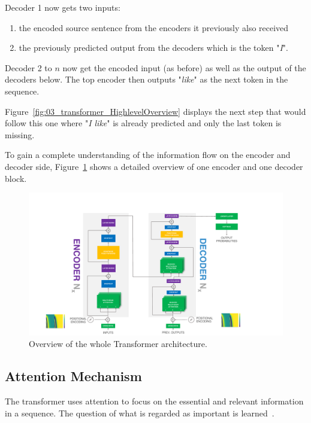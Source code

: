 Decoder 1 now gets two inputs: 

\begin{enumerate}
    \item the encoded source sentence from the encoders it previously also received
    \item the previously predicted output from the decoders which is the token "\textit{I}".
\end{enumerate}

Decoder 2 to $n$ now get the encoded input {(as before)} as well as the output of the decoders below. The top encoder then outputs "\textit{like}" as the next token in the sequence. 

Figure~\ref{fig:03_transformer_HighlevelOverview} displays the next step that would follow this one where "\textit{I like}" is already predicted and only the last token is missing.
\bigskip

To gain a complete understanding of the information flow on the encoder and decoder side, Figure~\ref{fig:03_transformer_overview} shows a detailed overview of one encoder and one decoder block.

\begin{figure}[t]
    \centering
    \includegraphics[width=\textwidth]{figures/03_theory/03_transformerArchitectureOverview}
    \caption{Overview of the whole Transformer architecture.}
    \label{fig:03_transformer_overview}
\end{figure}

\subsection{Attention Mechanism}

The transformer uses attention to focus on the essential and relevant information in a sequence. The question of what is regarded as important is learned~\cite{Vaswani2017d}.

